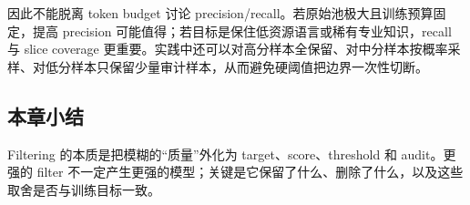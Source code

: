 因此不能脱离 token budget 讨论 precision/recall。若原始池极大且训练预算固定，提高 precision 可能值得；若目标是保住低资源语言或稀有专业知识，recall 与 slice coverage 更重要。实践中还可以对高分样本全保留、对中分样本按概率采样、对低分样本只保留少量审计样本，从而避免硬阈值把边界一次性切断。

\subsection{本章小结}

Filtering 的本质是把模糊的“质量”外化为 target、score、threshold 和 audit。更强的 filter 不一定产生更强的模型；关键是它保留了什么、删除了什么，以及这些取舍是否与训练目标一致。

